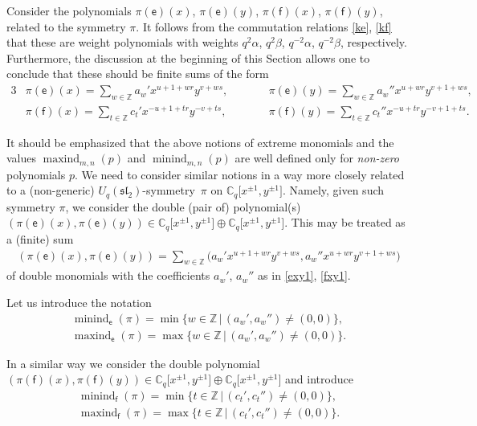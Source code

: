 \documentclass[10pt,a4paper]{amsart}
\numberwithin{equation}{section}
\begin{document}
Consider the polynomials $\pi(\mathsf{e})(x)$, $\pi(\mathsf{e})(y)$, $\pi(\mathsf{f})(x)$, $\pi(\mathsf{f})(y)$, related to the symmetry $\pi$. It follows from the commutation relations \eqref{ke}, \eqref{kf} that these are weight polynomials with weights $q^2\alpha$, $q^2\beta$, $q^{-2}\alpha$, $q^{-2}\beta$, respectively. Furthermore, the discussion at the beginning of this Section allows one to conclude that these should be finite sums of the form
\begin{alignat}{3}
&\pi(\mathsf{e})(x)=\sum_{w\in\mathbb{Z}}a_w'x^{u+1+wr}y^{v+ws}, \qquad && \pi(\mathsf{e})(y) =\sum_{w\in\mathbb{Z}}a_w''x^{u+wr}y^{v+1+ws}, & \label{exy1}\\
& \pi(\mathsf{f})(x) =\sum_{t\in\mathbb{Z}}c_t'x^{-u+1+tr}y^{-v+ts},\qquad && \pi(\mathsf{f})(y) =\sum_{t\in\mathbb{Z}}c_t''x^{-u+tr}y^{-v+1+ts}. & \label{fxy1}
\end{alignat}

It should be emphasized that the above notions of extreme monomials and the values \linebreak $\operatorname{maxind}_{m,n}(p)$ and $\operatorname{minind}_{m,n}(p)$ are well defined only for {\it non-zero} polynomials $p$. We need to consider similar notions in a way more closely related to a (non-generic) $U_q(\mathfrak{sl}_2)$-symmet\-ry~$\pi$ on $\mathbb{C}_q\big[x^{\pm 1},y^{\pm 1}\big]$. Namely, given such symmetry $\pi$, we consider the double (pair of) polynomial(s) $(\pi(\mathsf{e})(x),\pi(\mathsf{e})(y))\in\mathbb{C}_q\big[x^{\pm 1},y^{\pm 1}\big]\oplus\mathbb{C}_q\big[x^{\pm 1},y^{\pm 1}\big]$. This may be treated as a (finite) sum
\begin{gather*}
(\pi(\mathsf{e})(x),\pi(\mathsf{e})(y))=
\sum_{w\in\mathbb{Z}}\big(a_w'x^{u+1+wr}y^{v+ws},a_w''x^{u+wr}y^{v+1+ws}\big)
\end{gather*}
of double monomials with the coefficients $a_w'$, $a_w''$ as in \eqref{exy1}, \eqref{fxy1}.

Let us introduce the notation
\begin{gather*}
\operatorname{minind}_\mathsf{e}(\pi) =\min\{w\in\mathbb{Z}\,|\,(a_w',a_w'')\ne(0,0)\}, \\
 \operatorname{maxind}_\mathsf{e}(\pi) =\max\{w\in\mathbb{Z}\,|\,(a_w',a_w'')\ne(0,0)\}.
\end{gather*}

In a similar way we consider the double polynomial $(\pi(\mathsf{f})(x),\pi(\mathsf{f})(y))\in\mathbb{C}_q\big[x^{\pm 1},y^{\pm 1}\big]\oplus\mathbb{C}_q\big[x^{\pm 1},y^{\pm 1}\big]$ and introduce
\begin{gather*}
\operatorname{minind}_\mathsf{f}(\pi) =\min\{t\in\mathbb{Z}\,|\,(c_t',c_t'')\ne(0,0)\},\\
\operatorname{maxind}_\mathsf{f}(\pi) =\max\{t\in\mathbb{Z}\,|\,(c_t',c_t'')\ne(0,0)\}.
\end{gather*}
\end{document}

